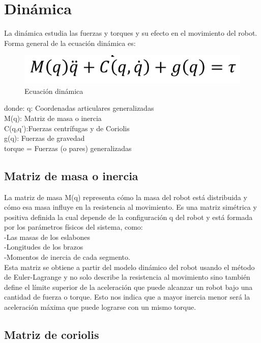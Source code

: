 \section{Dinámica} \label{sec:dinamica}

La dinámica estudia las fuerzas y torques y su efecto en el movimiento del robot. Forma general de la ecuación dinámica es: 
 
\begin{figure}[h]
	\centering
	\includegraphics[width=0.5\linewidth]{img/ECDINA}
	\caption{Ecuación dinámica}
	\label{fig:ECDINA}
\end{figure} 
 \newpage
  donde:
  q: Coordenadas articulares generalizadas\\[5pt]
  M(q): Matriz de masa o inercia\\[5pt]
  C(q,q’):Fuerzas centrífugas y de Coriolis\\[5pt]
  g(q): Fuerzas de gravedad\\[5pt]
  torque = Fuerzas (o pares) generalizadas\\[5pt]
  

\subsection{Matriz de masa o inercia}


La matriz de masa M(q) representa cómo la masa del robot está distribuida y cómo esa masa influye en la resistencia al movimiento. Es una matriz simétrica y positiva definida la cual depende de la configuración q del robot y está formada por los parámetros físicos del sistema, como: \\[5pt]
-Las masas de los eslabones \\[5pt]
-Longitudes de los brazos \\[5pt]
-Momentos de inercia de cada segmento. \\[5pt]

Esta matriz se obtiene a partir del modelo dinámico del robot usando el método de Euler-Lagrange y no solo describe la resistencia al movimiento sino también define el límite superior de la aceleración que puede alcanzar un robot bajo una cantidad de fuerza o torque. Esto nos indica que a mayor inercia menor será la aceleración máxima que puede lograrse con un mismo torque. 

\subsection{Matriz de coriolis}

